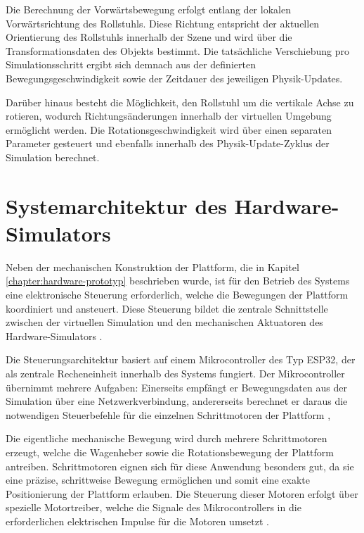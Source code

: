 Die Berechnung der Vorwärtsbewegung erfolgt entlang der lokalen Vorwärtsrichtung des Rollstuhls. Diese Richtung entspricht der aktuellen Orientierung des Rollstuhls innerhalb der Szene und wird über die Transformationsdaten des Objekts bestimmt. Die tatsächliche Verschiebung pro Simulationsschritt ergibt sich demnach aus der definierten Bewegungsgeschwindigkeit sowie der Zeitdauer des jeweiligen Physik-Updates.

Darüber hinaus besteht die Möglichkeit, den Rollstuhl um die vertikale Achse zu rotieren, wodurch Richtungsänderungen innerhalb der virtuellen Umgebung ermöglicht werden. Die Rotationsgeschwindigkeit wird über einen separaten Parameter gesteuert und ebenfalls innerhalb des Physik-Update-Zyklus der Simulation berechnet.

\section{Systemarchitektur des Hardware-Simulators}
Neben der mechanischen Konstruktion der Plattform, die in Kapitel \ref{chapter:hardware-prototyp} beschrieben wurde, ist für den Betrieb des Systems eine elektronische Steuerung erforderlich, welche die Bewegungen der Plattform koordiniert und ansteuert. Diese Steuerung bildet die zentrale Schnittstelle zwischen der virtuellen Simulation und den mechanischen Aktuatoren des Hardware-Simulators \cite{Bishop2006}.

Die Steuerungsarchitektur basiert auf einem Mikrocontroller des Typ ESP32, der als zentrale Recheneinheit innerhalb des Systems fungiert. Der Mikrocontroller übernimmt mehrere Aufgaben: Einerseits empfängt er Bewegungsdaten aus der Simulation über eine Netzwerkverbindung, andererseits berechnet er daraus die notwendigen Steuerbefehle für die einzelnen Schrittmotoren der Plattform \cite{ESPIDF}, \cite{Embedded}

Die eigentliche mechanische Bewegung wird durch mehrere Schrittmotoren erzeugt, welche die Wagenheber sowie die Rotationsbewegung der Plattform antreiben. Schrittmotoren eignen sich für diese Anwendung besonders gut, da sie eine präzise, schrittweise Bewegung ermöglichen und somit eine exakte Positionierung der Plattform erlauben. Die Steuerung dieser Motoren erfolgt über spezielle Motortreiber, welche die Signale des Mikrocontrollers in die erforderlichen elektrischen Impulse für die Motoren umsetzt \cite{Baral2026}.

